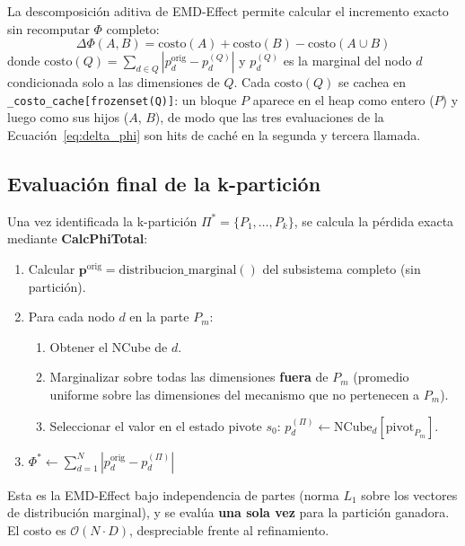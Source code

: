 La descomposición aditiva de EMD-Effect permite calcular el incremento exacto sin
recomputar $\Phi$ completo:
\begin{equation}
  \Delta\Phi(A, B) = \text{costo}(A) + \text{costo}(B) - \text{costo}(A \cup B)
  \label{eq:delta_phi}
\end{equation}
donde $\text{costo}(Q) = \sum_{d \in Q} |p_d^{\text{orig}} - p_d^{(Q)}|$
y $p_d^{(Q)}$ es la marginal del nodo $d$ condicionada solo a las dimensiones de $Q$.
Cada $\text{costo}(Q)$ se cachea en \texttt{\_costo\_cache[frozenset(Q)]}: un bloque
$P$ aparece en el heap como entero ($P$) y luego como sus hijos ($A$, $B$), de modo
que las tres evaluaciones de la Ecuación~\ref{eq:delta_phi} son hits de caché en la
segunda y tercera llamada.

\subsection{Evaluación final de la k-partición}

Una vez identificada la k-partición $\Pi^* = \{P_1, \ldots, P_k\}$, se calcula la
pérdida exacta mediante \textbf{CalcPhiTotal}:

\begin{enumerate}
  \item Calcular $\mathbf{p}^{\text{orig}} = \text{distribucion\_marginal}()$ del
        subsistema completo (sin partición).
  \item Para cada nodo $d$ en la parte $P_m$:
        \begin{enumerate}
          \item Obtener el NCube de $d$.
          \item Marginalizar sobre todas las dimensiones \textbf{fuera} de $P_m$
                (promedio uniforme sobre las dimensiones del mecanismo que no
                pertenecen a $P_m$).
          \item Seleccionar el valor en el estado pivote $s_0$:
                $p_d^{(\Pi)} \leftarrow \text{NCube}_d[\text{pivot}_{P_m}]$.
        \end{enumerate}
  \item $\Phi^* \leftarrow \sum_{d=1}^{N} |p_d^{\text{orig}} - p_d^{(\Pi)}|$
\end{enumerate}

Esta es la EMD-Effect bajo independencia de partes (norma $L_1$ sobre los vectores
de distribución marginal), y se evalúa \textbf{una sola vez} para la partición
ganadora. El costo es $\mathcal{O}(N \cdot D)$, despreciable frente al refinamiento.

